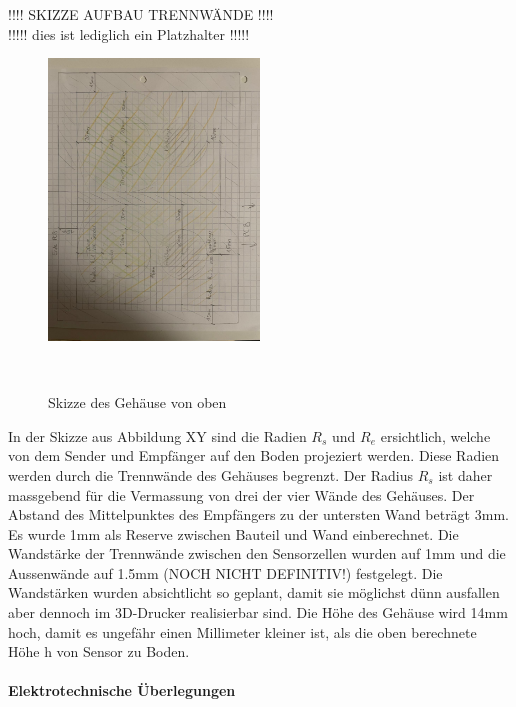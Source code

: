 \documentclass{article}
\begin{document}
!!!! SKIZZE AUFBAU TRENNWÄNDE !!!!\\
!!!!! dies ist lediglich ein Platzhalter !!!!!
\begin{figure}[H]
    \centering
    \includegraphics[width=0.5\textwidth]{Skizze_Gehause_oben.pdf}
    \caption{Skizze des Gehäuse von oben}~\label{fig:Skizze_Gehause}
\end{figure}

In der Skizze aus Abbildung XY sind die Radien \(R_s\) und \(R_e\) ersichtlich, welche 
von dem Sender und Empfänger auf den Boden projeziert werden. Diese Radien werden durch 
die Trennwände des Gehäuses begrenzt. Der Radius \(R_s\) ist daher massgebend für die 
Vermassung von drei der vier Wände des Gehäuses. Der Abstand des Mittelpunktes des 
Empfängers zu der untersten Wand beträgt 3mm. Es wurde 1mm als Reserve zwischen 
Bauteil und Wand einberechnet. Die Wandstärke der Trennwände zwischen den Sensorzellen
wurden auf 1mm und die Aussenwände auf 1.5mm (NOCH NICHT DEFINITIV!) festgelegt. 
Die Wandstärken wurden absichtlicht so geplant, damit sie möglichst dünn ausfallen 
aber dennoch im 3D-Drucker realisierbar sind. Die Höhe des Gehäuse wird 14mm hoch, 
damit es ungefähr einen Millimeter kleiner ist, als die oben berechnete Höhe h von 
Sensor zu Boden.



\paragraph{Elektrotechnische Überlegungen}
\end{document}
